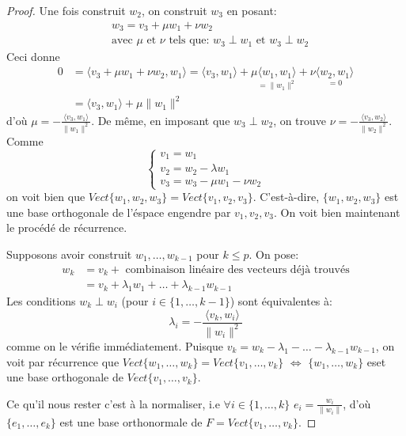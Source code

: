 \documentclass[a4paper]{article}
\newcommand{\scalair}[1]{\langle #1 \rangle}
\begin{document}
\begin{proof}
    \par
    Une fois construit $w_2$, on construit $w_3$ en posant:
    \begin{align*}
        &w_3 = v_3 + \mu w_1 + \nu w_2\\
        &\text{avec } \mu \text{ et } \nu \text{ tels que: } w_3 \perp w_1 \text{ et } w_3 \perp w_2
    \end{align*}
    Ceci donne
    \begin{align*}
        0 &= \scalair{v_3 + \mu w_1 + \nu w_2, w_1} = \scalair{v_3, w_1} + \mu \underset{= \|w_1\|^2}{\scalair{w_1, w_1}} + \nu \underset{= 0}{\scalair{w_2, w_1}}\\
          &= \scalair{v_3, w_1} + \mu \|w_1\|^2 
    \end{align*}
    d'où $\mu = - \frac{\scalair{v_3, w_1}}{\|w_1\|^2}$. De même, en imposant que $w_3 \perp w_2$, on trouve $\nu = - \frac{\scalair{v_3, w_2}}{\|w_2\|^2}$. Comme
    \[
    \begin{cases}
        v_1 = w_1\\
        v_2 = w_2 - \lambda w_1\\
        v_3 = w_3 - \mu w_1 - \nu w_2
    \end{cases}
    \] 
    on voit bien que $Vect\{w_1, w_2, w_3\} = Vect\{v_1, v_2, v_3\}$. C'est-à-dire, $\{w_1, w_2, w_3\}$ est une base orthogonale de l'éspace engendre par $v_1, v_2, v_3$. On voit bien maintenant le procédé de récurrence.
    \par
    Supposons avoir construit $w_1, \ldots, w_{k-1}$ pour $k \le p$. On pose:
    \begin{align*}
        w_k &= v_k + \text{ combinaison linéaire des vecteurs déjà trouvés}\\
            &= v_k + \lambda_1w_1 + \ldots + \lambda_{k-1}w_{k-1}
    \end{align*}
    Les conditions $w_k \perp w_i$ (pour $i \in \{1, \ldots, k-1\}$) sont équivalentes à:
    \[
        \lambda_i = - \frac{\scalair{v_k, w_i}}{\|w_i\|^2}
    \] 
    comme on le vérifie immédiatement. Puisque $v_k = w_k - \lambda_1 - \ldots - \lambda_{k-1}w_{k-1}$, on voit par récurrence que $Vect\{w_1, \ldots, w_k\} = Vect\{v_1, \ldots, v_k\}$ $\iff$ $\{w_1, \ldots, w_k\}$ eset une base orthogonale de $Vect\{v_1, \ldots, v_k\}$.
    \par
    Ce qu'il nous rester c'est à la normaliser, i.e  $\forall i \in \{1, \ldots, k\}$ $e_i = \frac{w_i}{\|w_i\|}$, d'où $\{e_1, \ldots, e_k\}$ est une base orthonormale de $F = Vect\{v_1, \ldots, v_k\}$.
\end{proof}
\end{document}
